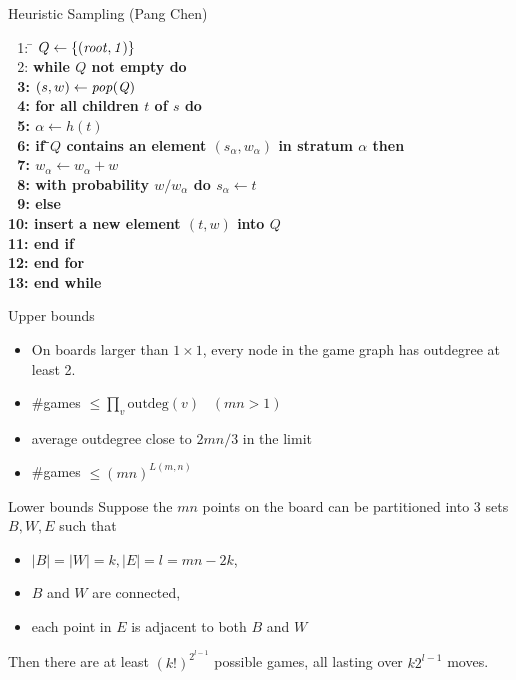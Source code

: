 \documentclass{prosper}
\begin{document}
\begin{slide}{Heuristic Sampling (Pang Chen)}
\begin{tabbing}
\,\,\,\,1: \= $Q \leftarrow \{ (\it{root},1) \}$ \\
\,\,\,\,2: \> \bf{wh}\=\bf{ile} $Q$ not empty \bf{do} \\
\,\,\,\,3: \>       \> $(s,w) \leftarrow \it{pop}(Q)$ \\
\,\,\,\,4: \>       \> \bf{fo}\=\bf{r all} children $t$ of $s$ \bf{do} \\
\,\,\,\,5: \>       \>        \> $\alpha \leftarrow h(t)$ \\
\,\,\,\,6: \>       \>        \> \bf{if} \=$Q$ contains an element $(s_\alpha,w_\alpha)$ in stratum $\alpha$ \bf{then} \\
\,\,\,\,7: \>       \>        \>         \> $w_\alpha \leftarrow w_\alpha + w$ \\
\,\,\,\,8: \>       \>        \>         \> with probability $w/w_\alpha$ do $s_\alpha \leftarrow t$ \\
\,\,\,\,9: \>       \>        \> \bf{else} \\
10: \>      \>        \>         \> insert a new element $(t,w)$ into $Q$ \\
11: \> \> \> \bf{end if} \\
12: \> \> \bf{end for} \\
13: \> \bf{end while} 
\end{tabbing}
\end{slide}

\begin{slide}{Upper bounds}
\begin{itemize}
\item
On boards larger than $1\times 1$, every node in the game graph has
outdegree at least 2.
\item \#games $ \leq \prod_v \mbox{outdeg}(v) \,\,\,\,\,(mn>1)$
\item average outdegree close to $2mn/3$ in the limit
\item \#games $ \leq(mn)^{L(m,n)}$
\end{itemize}
\end{slide}


\begin{slide}{Lower bounds}
Suppose the $mn$ points on the board can be partitioned
into 3 sets $B,W,E$ such that
\begin{itemize}
\item $|B|=|W|=k, |E|=l=mn-2k$,
\item $B$ and $W$ are connected,
\item each point in $E$ is adjacent to both $B$ and $W$
\end{itemize}
Then there are at least $(k!)^{2^{l-1}}$ possible games,
all lasting over $k{2^{l-1}}$ moves.
\end{slide}
\end{document}
